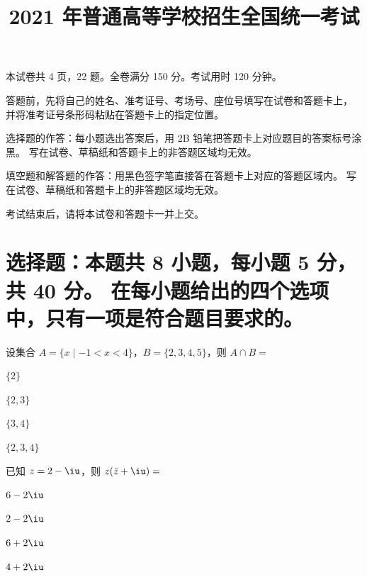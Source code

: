 \documentclass{exam-zh}
\title{2021 年普通高等学校招生全国统一考试}
\begin{document}

\secret

\maketitle

本试卷共 4 页，22 题。全卷满分 150 分。考试用时 120 分钟。


\begin{notice}
  \item 答题前，先将自己的姓名、准考证号、考场号、座位号填写在试卷和答题卡上，
    并将准考证号条形码粘贴在答题卡上的指定位置。
  \item 选择题的作答：每小题选出答案后，用 2B 铅笔把答题卡上对应题目的答案标号涂黑。
    写在试卷、草稿纸和答题卡上的非答题区域均无效。
  \item 填空题和解答题的作答：用黑色签字笔直接答在答题卡上对应的答题区域内。
    写在试卷、草稿纸和答题卡上的非答题区域均无效。
  \item 考试结束后，请将本试卷和答题卡一并上交。
\end{notice}



\section{%
  选择题：本题共 8 小题，每小题 5 分，共 40 分。
  在每小题给出的四个选项中，只有一项是符合题目要求的。
}

\begin{question}[points = 2]
  设集合 $A = \{x \mid -1 < x < 4\}$，$B = \{2, 3, 4, 5\}$，则 $A \cap B = $ \paren[B]

  \begin{choices}
    \item $\{2\}$
    \item $\{2, 3\}$
    \item $\{3, 4\}$
    \item $\{2, 3, 4\}$
  \end{choices}
\end{question}

\begin{question}
  已知 $z = 2 - \iu$，则 $z (\bar{z} + \iu) = $ \paren
  \begin{choices}
    \item $6 - 2\iu$
    \item $2 - 2\iu$
    \item $6 + 2\iu$
    \item $4 + 2\iu$
  \end{choices}
\end{question}
\end{document}
